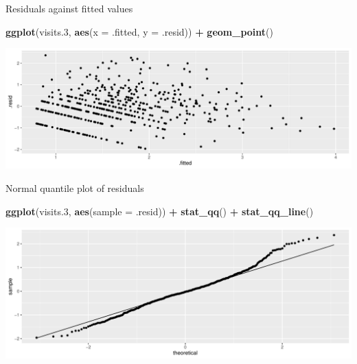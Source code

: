 \documentclass[
  ignorenonframetext,
]{beamer}
\newenvironment{Shaded}{\begin{snugshade}}{\end{snugshade}}
\newcommand{\DataTypeTok}[1]{\textcolor[rgb]{0.13,0.29,0.53}{#1}}
\newcommand{\FloatTok}[1]{\textcolor[rgb]{0.00,0.00,0.81}{#1}}
\newcommand{\KeywordTok}[1]{\textcolor[rgb]{0.13,0.29,0.53}{\textbf{#1}}}
\newcommand{\NormalTok}[1]{#1}
\newcommand{\OperatorTok}[1]{\textcolor[rgb]{0.81,0.36,0.00}{\textbf{#1}}}
\newcommand{\StringTok}[1]{\textcolor[rgb]{0.31,0.60,0.02}{#1}}
\begin{document}
\begin{frame}[fragile]{Residuals against fitted values}
\protect\hypertarget{residuals-against-fitted-values}{}

\begin{Shaded}
\begin{Highlighting}[]
\KeywordTok{ggplot}\NormalTok{(visits}\FloatTok{.3}\NormalTok{, }\KeywordTok{aes}\NormalTok{(}\DataTypeTok{x =}\NormalTok{ .fitted, }\DataTypeTok{y =}\NormalTok{ .resid)) }\OperatorTok{+}
\StringTok{  }\KeywordTok{geom_point}\NormalTok{()}
\end{Highlighting}
\end{Shaded}

\includegraphics{slides_d29_files/figure-beamer/unnamed-chunk-67-1.pdf}

\end{frame}

\begin{frame}[fragile]{Normal quantile plot of residuals}
\protect\hypertarget{normal-quantile-plot-of-residuals-1}{}

\begin{Shaded}
\begin{Highlighting}[]
\KeywordTok{ggplot}\NormalTok{(visits}\FloatTok{.3}\NormalTok{, }\KeywordTok{aes}\NormalTok{(}\DataTypeTok{sample =}\NormalTok{ .resid)) }\OperatorTok{+}\StringTok{ }\KeywordTok{stat_qq}\NormalTok{() }\OperatorTok{+}\StringTok{ }\KeywordTok{stat_qq_line}\NormalTok{()}
\end{Highlighting}
\end{Shaded}

\includegraphics{slides_d29_files/figure-beamer/unnamed-chunk-68-1.pdf}

\end{frame}
\end{document}
